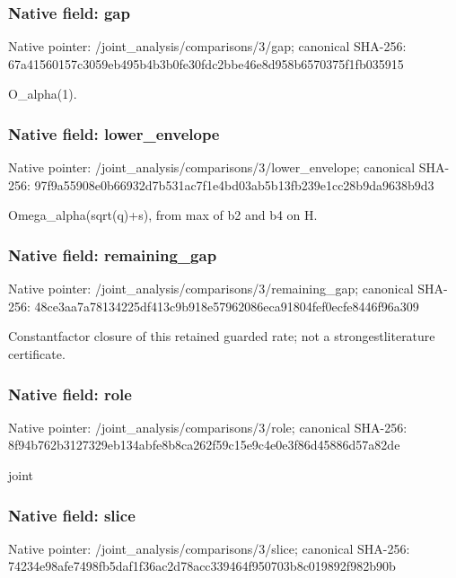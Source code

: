 \documentclass[10pt,a4paper]{article}
\begin{document}
\subsubsection{Native field: gap}


Native pointer: /joint\_analysis/comparisons/3/gap; canonical SHA-256: 67a41560157c3059eb495b4b\allowbreak{}3b0fe30fdc2bbe46e8d958b6\allowbreak{}570375f1fb035915


O\_alpha(1).


\subsubsection{Native field: lower\_envelope}


Native pointer: /joint\_analysis/comparis\allowbreak{}ons/3/lower\_envelope; canonical SHA-256: 97f9a55908e0b66932d7b531\allowbreak{}ac7f1e4bd03ab5b13fb239e1\allowbreak{}cc28b9da9638b9d3


Omega\_alpha(sqrt(q)+s), from max of b2 and b4 on H.


\subsubsection{Native field: remaining\_gap}


Native pointer: /joint\_analysis/comparis\allowbreak{}ons/3/remaining\_gap; canonical SHA-256: 48ce3aa7a78134225df413c9\allowbreak{}b918e57962086eca91804fef\allowbreak{}0ecfe8446f96a309


Constantfactor closure of this retained guarded rate; not a strongestliterature certificate.


\subsubsection{Native field: role}


Native pointer: /joint\_analysis/comparisons/3/role; canonical SHA-256: 8f94b762b3127329eb134abf\allowbreak{}e8b8ca262f59c15e9c4e0e3f\allowbreak{}86d45886d57a82de


joint


\subsubsection{Native field: slice}


Native pointer: /joint\_analysis/comparisons/3/slice; canonical SHA-256: 74234e98afe7498fb5daf1f3\allowbreak{}6ac2d78acc339464f950703b\allowbreak{}8c019892f982b90b
\end{document}
